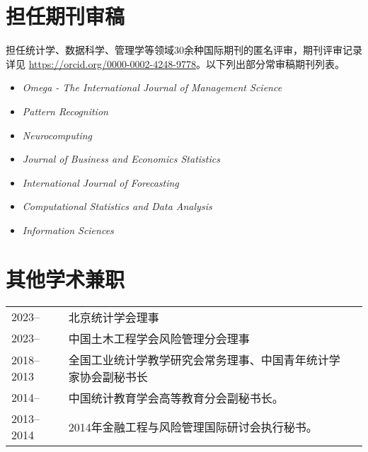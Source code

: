 \documentclass[twoside,a4paper,11pt]{article}
\begin{document}
\section*{担任期刊审稿}

担任统计学、数据科学、管理学等领域30余种国际期刊的匿名评审，期刊评审记录详见 \url{https://orcid.org/0000-0002-4248-9778}。以下列出部分常审稿期刊列表。

\begin{itemize}
\item \emph{Omega - The International Journal of Management Science}
\item \emph{Pattern Recognition}
\item \emph{Neurocomputing}
\item  \emph{Journal of Business and Economics Statistics}
\item  \emph{International Journal of Forecasting}
\item  \emph{Computational Statistics and Data Analysis}
\item  \emph{Information Sciences}
\end{itemize}

\section*{其他学术兼职}
\begin{tabular}{l p{} l}
  2023--     & 北京统计学会理事                 \\
  2023--     & 中国土木工程学会风险管理分会理事 \\
  2018--2013 & 全国工业统计学教学研究会常务理事、中国青年统计学家协会副秘书长 \\
  2014--     & 中国统计教育学会高等教育分会副秘书长。                         \\
  2013--2014 & 2014年金融工程与风险管理国际研讨会执行秘书。                   \\

\end{tabular}


\end{document}
